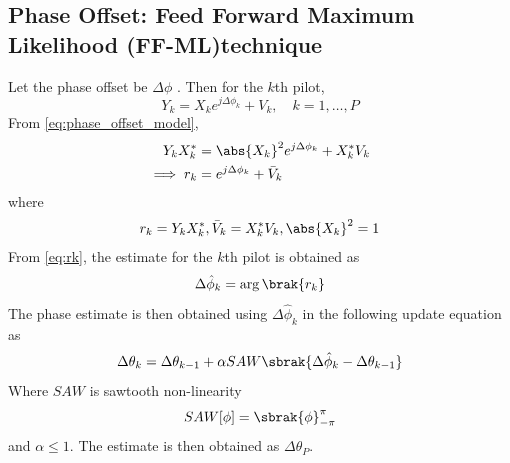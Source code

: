 \documentclass[journal,12pt,twocolumn]{IEEEtran}
\begin{document}
\subsection{Phase Offset: Feed Forward Maximum Likelihood (FF-ML)technique}
Let the phase offset be 
$\Delta\phi$  
\cite{phase_offset}
.  
Then for the $k$th pilot,
\begin{equation}
\label{eq:phase_offset_model}
Y_k= X_k e^{j\Delta\phi_k} + V_k, \quad k = 1,\dots,P
\end{equation}  
From \eqref{eq:phase_offset_model},
%
\begin{align}
Y_kX_k^*&= \abs{X_k}^2e^{j \Delta\phi_k}+ X_k^*{V}_k\\
\implies r_k&=e^{j\Delta\phi_k}+ \bar{V}_k
\label{eq:rk}
\end{align}
where
\begin{align}
r_k=Y_kX_k^*, \bar{V}_k=X_k^*{V}_k, \abs{X_k}^2=1
\end{align}
From \eqref{eq:rk}, the estimate for the $k$th pilot is obtained as
\begin{equation}
\label{eq:phase_estimation}
\Delta\hat{\phi}_k  = \arg\brak{r_k}
\end{equation} 
%
The phase estimate is then obtained using $\Delta\hat{\phi}_k $ in the following update equation as
\begin{equation}
\Delta\theta_k =\Delta\theta_{k-1} + \alpha{SAW}\sbrak{\Delta\hat{\phi}_k
-\Delta\theta_{k-1}}
\end{equation}
%
Where $SAW$ is sawtooth non-linearity 
\begin{equation}
 SAW[\phi]=\sbrak{\phi}^{\pi}_{-\pi}
\end{equation} 
and $\alpha \leq 1$. The estimate is then obtained as $\Delta\theta_{P}$.
 
\end{document}
